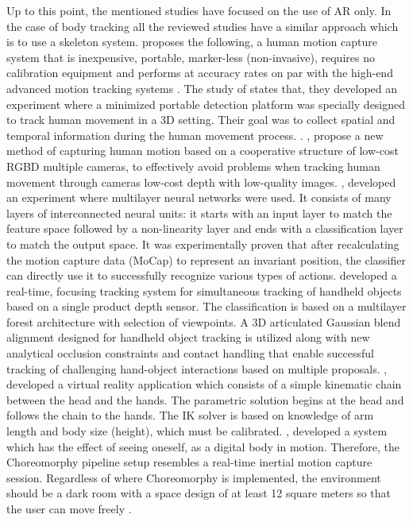 \documentclass[twocolumn]{article}
\begin{document}
Up to this point, the mentioned studies have focused on the use of AR only. In the case of 
body tracking all the reviewed studies have a similar approach which is to use a skeleton 
system. \citeauthor{3Dmotionca} proposes the following, a human motion capture system that is
inexpensive, portable, marker-less (non-invasive), requires no calibration equipment and 
performs at accuracy rates on par with the high-end advanced motion tracking systems 
\cite{3Dmotionca}. The study of \citeauthor{TowardsHum} states that, they developed an 
experiment where a minimized portable detection platform was specially designed to track 
human movement in a 3D setting. Their goal was to collect spatial and temporal information 
during the human movement process. \cite{TowardsHum}. \citeauthor{HumanMotio}, propose a new 
method of capturing human motion based on a cooperative structure of low-cost RGBD multiple 
cameras, to effectively avoid problems when tracking human movement through cameras 
low-cost depth with low-quality images\cite{HumanMotio}. \citeauthor{Humanactio}, developed an 
experiment where multilayer neural networks were used. It consists of many layers of interconnected 
neural units: it starts with an input layer to match the feature space followed by a non-linearity 
layer and ends with a classification layer to match the output space. It was experimentally proven 
that after recalculating the motion capture data (MoCap) to represent an invariant position, the 
classifier can directly use it to successfully recognize various types of actions\cite{Humanactio}.
\citeauthor{Real-TimeJ} developed a real-time, focusing tracking system for simultaneous tracking 
of handheld objects based on a single product depth sensor. The classification is based on a 
multilayer forest architecture with selection of viewpoints. A 3D articulated Gaussian blend 
alignment designed for handheld object tracking is utilized along with new analytical occlusion 
constraints and contact handling that enable successful tracking of challenging hand-object
interactions based on multiple proposals\cite{Real-TimeJ}. \citeauthor{Humanupper}, developed 
a virtual reality application which consists of a simple kinematic chain between the head and 
the hands. The parametric solution begins at the head and follows the chain to the hands. The 
IK solver is based on knowledge of arm length and body size (height), which must be 
calibrated\cite{Humanupper}. \citeauthor{Choreomorp}, developed a system which has the effect of 
seeing oneself, as a digital body in motion. Therefore, the Choreomorphy pipeline setup resembles 
a real-time inertial motion capture session. Regardless of where Choreomorphy is implemented, the 
environment should be a dark room with a space design of at least 12 square meters so that the user 
can move freely \cite{Choreomorp}.
\bigskip

\clearpage

\printbibliography
\end{document}
